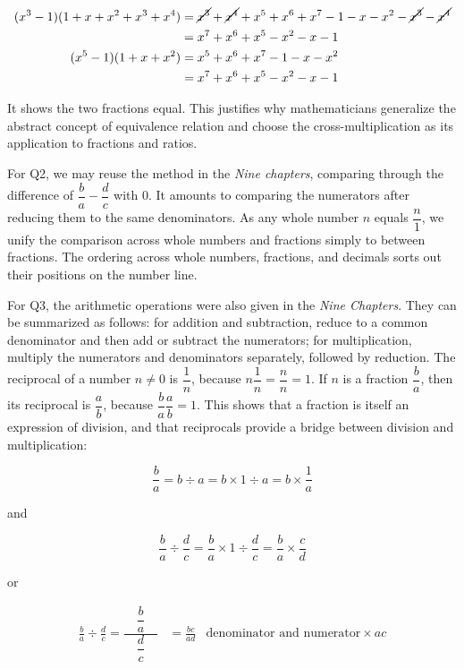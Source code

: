\documentclass[b5paper]{article}
\begin{document}
\begin{align*}
(x^3 - 1)(1 + x + x^2 + x^3 + x^4) &= \cancel{x^3} + \cancel{x^4} + x^5 + x^6 + x^7 - 1 - x - x^2 - \cancel{x^3} - \cancel{x^4} \\
  &= x^7 + x^6 + x^5 - x^2 - x - 1 \\
(x^5 - 1)(1 + x + x^2) &= x^5 + x^6 + x^7 - 1 - x - x^2 \\
  &= x^7 + x^6 + x^5 - x^2 - x - 1
\end{align*}

It shows the two fractions equal. This justifies why mathematicians generalize the abstract concept of equivalence relation and choose the cross-multiplication as its application to fractions and ratios.

\vspace{3mm}
For Q2, we may reuse the method in the \emph{Nine chapters}, comparing through the difference of $\dfrac{b}{a} - \dfrac{d}{c}$ with 0. It amounts to comparing the numerators after reducing them to the same denominators. As any whole number $n$ equals $\dfrac{n}{1}$, we unify the comparison across whole numbers and fractions simply to between fractions. The ordering across whole numbers, fractions, and decimals sorts out their positions on the number line.

\vspace{3mm}
For Q3, the arithmetic operations were also given in the \emph{Nine Chapters}. They can be summarized as follows: for addition and subtraction, reduce to a common denominator and then add or subtract the numerators; for multiplication, multiply the numerators and denominators separately, followed by reduction. The reciprocal of a number $n\ne0$ is $\dfrac{1}{n}$, because $n\dfrac{1}{n}=\dfrac{n}{n}=1$. If $n$ is a fraction $\dfrac{b}{a}$, then its reciprocal is $\dfrac{a}{b}$, because $\dfrac{b}{a}\dfrac{a}{b}=1$. This shows that a fraction is itself an expression of division, and that reciprocals provide a bridge between division and multiplication:

\[
\frac{b}{a} = b \div a = b \times 1 \div a = b \times \frac{1}{a}
\]

and

\[
\frac{b}{a} \div \frac{d}{c} = \frac{b}{a} \times 1 \div \frac{d}{c} = \frac{b}{a} \times \frac{c}{d}
\]

or

\begin{align*}
\frac{b}{a} \div \frac{d}{c} = \dfrac{\quad\dfrac{b}{a}\quad}{\dfrac{d}{c}} &= \frac{bc}{ad} & \text{denominator and numerator} \times ac
\end{align*}
\end{document}
